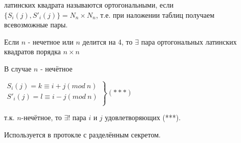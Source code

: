  латинских квадрата называются ортогональными, если $\{S_i(j),S'_i(j)\}=N_n\times N_n$, т.е. при наложении таблиц получаем всевозможные пары. 

\thr Если $n$ - нечетное или $n$ делится на 4, то $\exists$ пара ортогональных латинских квадратов порядка $n\times n$

В случае $n$ - нечётное\par
$\left.
\begin{array}{ccc}
	S_i(j)=k\equiv i+j(mod\:n)\\
	S'_i(j)=l\equiv i-j(mod\:n)\\
\end{array}
\right\}(***)$\par
т.к. $n$-нечётное, то $\exists !$ пара $i$ и $j$ удовлетворяющих (***).

\examplei Используется в протокле с разделённым секретом.